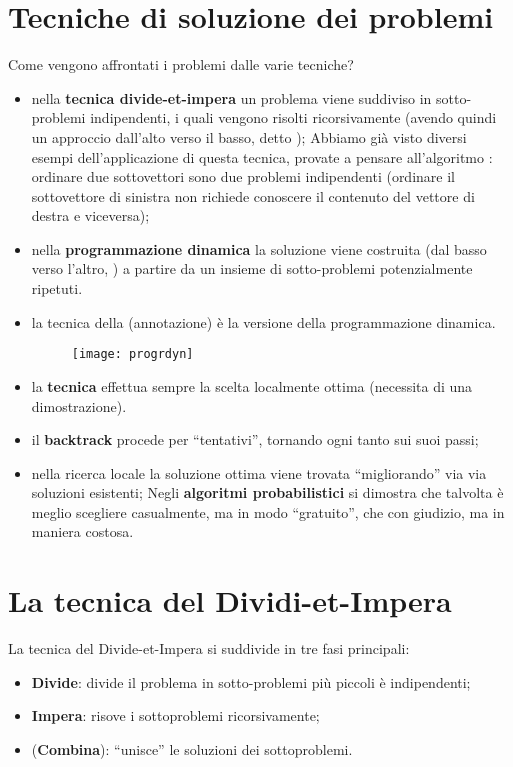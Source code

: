 \section*{Tecniche di soluzione dei problemi}

Come vengono affrontati i problemi dalle varie tecniche?
\begin{itemize}
	\item nella \textbf{tecnica divide-et-impera} un problema viene suddiviso in sotto-problemi indipendenti, i quali vengono risolti ricorsivamente (avendo quindi un approccio dall'alto verso il basso, detto ); Abbiamo già visto diversi esempi dell'applicazione di questa tecnica, provate a pensare all'algoritmo \mergeSort: ordinare due sottovettori sono due problemi indipendenti (ordinare il sottovettore di sinistra non richiede conoscere il contenuto del vettore di destra e viceversa);
	\item nella \textbf{programmazione dinamica} la soluzione viene costruita (dal basso verso l'altro, ) a partire da un insieme di sotto-problemi potenzialmente ripetuti.
	\item la tecnica della  (annotazione) è la versione  della programmazione dinamica.
	\begin{figure}[H]
        \centering
        \texttt{[image: progrdyn]}
    \end{figure}
	\item la \textbf{tecnica } effettua sempre la scelta localmente ottima (necessita di una dimostrazione).
	\item il \textbf{backtrack} procede per \enquote{tentativi}, tornando ogni tanto sui suoi passi;
	\item nella ricerca locale la soluzione ottima viene trovata \enquote{migliorando} via via soluzioni esistenti; Negli \textbf{algoritmi probabilistici} si dimostra che talvolta è meglio scegliere casualmente, ma in modo \enquote{gratuito}, che con giudizio, ma in maniera costosa.
\end{itemize}

\section*{La tecnica del Dividi-et-Impera}

La tecnica del Divide-et-Impera si suddivide in tre fasi principali:
\begin{itemize}
	\item \textbf{Divide}: divide il problema in sotto-problemi più piccoli è indipendenti;
	\item \textbf{Impera}: risove i sottoproblemi ricorsivamente;
	\item (\textbf{Combina}): \enquote{unisce} le soluzioni dei sottoproblemi.
\end{itemize}

\ifsubfile

\fi